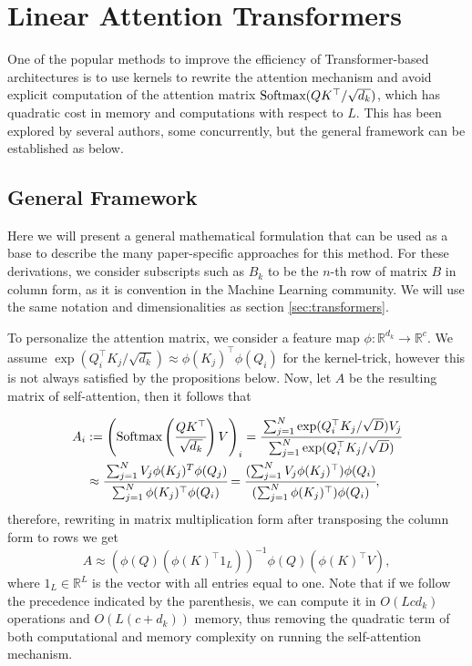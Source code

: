 \section{Linear Attention Transformers}

One of the popular methods to improve the efficiency of Transformer-based architectures is to use kernels to rewrite the attention mechanism and avoid explicit computation of the attention matrix $\text{Softmax}(QK^\top / \sqrt{d_k})$, which has quadratic cost in memory and computations with respect to $L$. This has been explored by several authors, some concurrently, but the general framework can be established as below.

\subsection{General Framework}
Here we will present a general mathematical formulation that can be used as a base to describe the many paper-specific approaches for this method. For these derivations, we consider subscripts such as $B_k$ to be the $n$-th row of matrix $B$ in column form, as it is convention in the Machine Learning community. We will use the same notation and dimensionalities as section \ref{sec:transformers}.

To personalize the attention matrix, we consider a feature map $\phi \colon \mathbb{R}^{d_k} \to \mathbb{R}^c$. We assume $\exp(Q_i^\top K_j / \sqrt{d_k}) \approx \phi(K_j)^\top \phi(Q_i)$ for the kernel-trick, however this is not always satisfied by the propositions below. Now, let $A$ be the resulting matrix of self-attention, then it follows that

\begin{equation}
\label{eq:approx}
    \begin{split}
        A_i &:= \left(\text{Softmax} \left( \cfrac{QK^\top}{\sqrt{d_k}} \right)V\right)_i = \cfrac{\sum_{j=1}^N \exp(Q_i^\top K_j/ \sqrt{D}) V_j}{\sum_{j=1}^N \exp(Q_i^\top K_j / \sqrt{D})} \\ 
        &\approx \cfrac{\sum_{j=1}^N  V_j \phi(K_j)^T \phi(Q_j)}{\sum_{j=1}^N \phi(K_j)^\top \phi(Q_i)} 
        = \cfrac{(\sum_{j=1}^N V_j \phi(K_j)^\top)\phi(Q_i)}{(\sum_{j=1}^N \phi(K_j)^\top)\phi(Q_i)},
    \end{split}
\end{equation}
therefore, rewriting in matrix multiplication form after transposing the column form to rows we get
$$A \approx (\phi(Q) (\phi(K)^\top 1_L))^{-1} \phi(Q) (\phi(K)^\top V),$$ 
where $1_L \in \mathbb{R}^L$ is the vector with all entries equal to one. Note that if we follow the precedence indicated by the parenthesis, we can compute it in $O(Lcd_k)$ operations and $O(L(c+d_k))$ memory, thus removing the quadratic term of both computational and memory complexity on running the self-attention mechanism.

